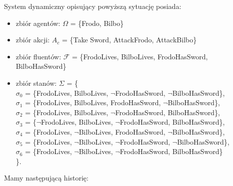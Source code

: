 \documentclass[11pt,a4paper]{article}
\begin{document}
    System dynamiczny opisujący powyższą sytuację posiada:
    \begin{itemize}
    \item zbiór agentów: $\Omega$ = \{Frodo, Bilbo\}
    \item zbiór akcji: $A_c$ = \{Take Sword, AttackFrodo, AttackBilbo\}
    \item zbiór fluentów: $\mathcal{F}$ = \{FrodoLives, BilboLives, FrodoHasSword, BilboHasSword\}
    \item zbiór stanów: $\Sigma$ = \{\\
    	$\sigma_0$ = \{FrodoLives, BilboLives, $\neg$FrodoHasSword, $\neg$BilboHasSword\},\\
    	$\sigma_1$ = \{FrodoLives, BilboLives, FrodoHasSword, $\neg$BilboHasSword\},\\
    	$\sigma_2$ = \{FrodoLives, BilboLives, $\neg$FrodoHasSword, BilboHasSword\},\\
    	$\sigma_3$ = \{$\neg$FrodoLives, BilboLives, $\neg$FrodoHasSword, BilboHasSword\},\\
    	$\sigma_4$ = \{FrodoLives, $\neg$BilboLives, FrodoHasSword, $\neg$BilboHasSword\},\\
    	$\sigma_5$ = \{FrodoLives, $\neg$BilboLives, $\neg$FrodoHasSword, $\neg$BilboHasSword\},\\
    	$\sigma_6$ = \{FrodoLives, $\neg$BilboLives, $\neg$FrodoHasSword, BilboHasSword\}\\
    \}.
    \end{itemize}
    Mamy następującą historię:
    
\end{document}
